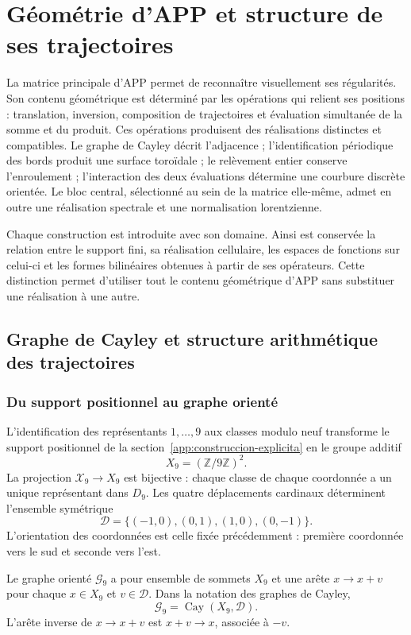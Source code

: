\section{Géométrie d'APP et structure de ses trajectoires}
\label{geo:chap}

La matrice principale d'APP permet de reconnaître visuellement ses régularités. Son contenu géométrique est déterminé par les opérations qui relient ses positions : translation, inversion, composition de trajectoires et évaluation simultanée de la somme et du produit. Ces opérations produisent des réalisations distinctes et compatibles. Le graphe de Cayley décrit l'adjacence ; l'identification périodique des bords produit une surface toroïdale ; le relèvement entier conserve l'enroulement ; l'interaction des deux évaluations détermine une courbure discrète orientée. Le bloc central, sélectionné au sein de la matrice elle-même, admet en outre une réalisation spectrale et une normalisation lorentzienne.

Chaque construction est introduite avec son domaine. Ainsi est conservée la relation entre le support fini, sa réalisation cellulaire, les espaces de fonctions sur celui-ci et les formes bilinéaires obtenues à partir de ses opérateurs. Cette distinction permet d'utiliser tout le contenu géométrique d'APP sans substituer une réalisation à une autre.

\subsection{Graphe de Cayley et structure arithmétique des trajectoires}
\label{geo:cayley}

\subsubsection{Du support positionnel au graphe orienté}

L'identification des représentants $1,\ldots,9$ aux classes modulo neuf transforme le support positionnel de la section~\ref{app:construccion-explicita} en le groupe additif
\[
 X_9=(\mathbb Z/9\mathbb Z)^2.
\]
La projection $\mathcal X_9\to X_9$ est bijective : chaque classe de chaque coordonnée a un unique représentant dans $D_9$. Les quatre déplacements cardinaux déterminent l'ensemble symétrique
\[
 \mathscr D=\{(-1,0),(0,1),(1,0),(0,-1)\}.
\]
L'orientation des coordonnées est celle fixée précédemment : première coordonnée vers le sud et seconde vers l'est.

\begin{definicion}
\label{geo:def-grafo}
Le graphe orienté $\mathscr G_9$ a pour ensemble de sommets $X_9$ et une arête $x\to x+v$ pour chaque $x\in X_9$ et $v\in\mathscr D$. Dans la notation des graphes de Cayley,
\[
 \mathscr G_9=\operatorname{Cay}(X_9,\mathscr D).
\]
L'arête inverse de $x\to x+v$ est $x+v\to x$, associée à $-v$.
\end{definicion}

